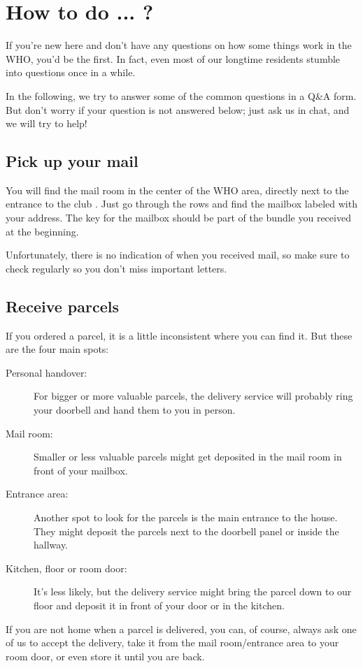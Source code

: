 \chapter{How to do ... ?} \label{chap:qna}
If you're new here and don't have any questions on how some things work in the WHO, you'd be the first. In fact, even most of our longtime residents stumble into questions once in a while.

In the following, we try to answer some of the common questions in a Q&A form. But don't worry if your question is not answered below; just ask us in chat, and we will try to help!

\section{Pick up your mail}
You will find the mail room in the center of the WHO area, directly next to the entrance to the club . Just go through the rows and find the mailbox labeled with your address. The key for the mailbox should be part of the bundle you received at the beginning. 

Unfortunately, there is no indication of when you received mail, so make sure to check regularly so you don't miss important letters.

\section{Receive parcels}
If you ordered a parcel, it is a little inconsistent where you can find it. But these are the four main spots:
\begin{description}
    \item[Personal handover:] For bigger or more valuable parcels, the delivery service will probably ring your doorbell and hand them to you in person.
    \item[Mail room:] Smaller or less valuable parcels might get deposited in the mail room in front of your mailbox.
    \item[Entrance area:] Another spot to look for the parcels is the main entrance to the house. They might deposit the parcels next to the doorbell panel or inside the hallway.
    \item[Kitchen, floor or room door:] It's less likely, but the delivery service might bring the parcel down to our floor and deposit it in front of your door or in the kitchen.
\end{description}

If you are not home when a parcel is delivered, you can, of course, always ask one of us to accept the delivery, take it from the mail room/entrance area to your room door, or even store it until you are back.

